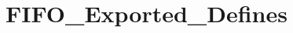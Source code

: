 \hypertarget{group___f_i_f_o___exported___defines}{}\section{F\+I\+F\+O\+\_\+\+Exported\+\_\+\+Defines}
\label{group___f_i_f_o___exported___defines}
